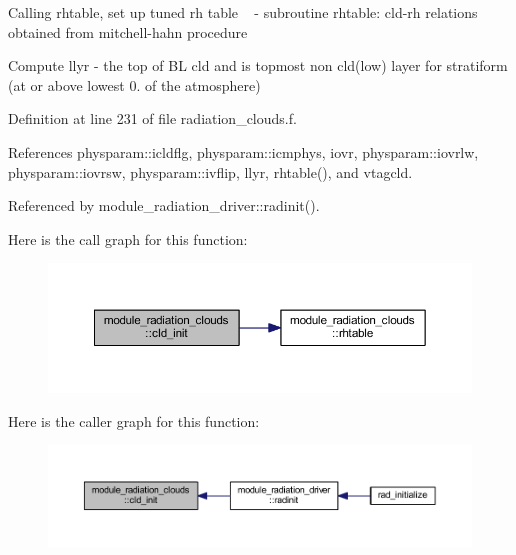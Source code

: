 \begin{DoxyEnumerate}
\item Calling rhtable, set up tuned rh table ~\newline
 -\/ subroutine rhtable\+: cld-\/rh relations obtained from mitchell-\/hahn procedure
\item Compute llyr -\/ the top of BL cld and is topmost non cld(low) layer for stratiform (at or above lowest 0. of the atmosphere) 
\end{DoxyEnumerate}

Definition at line 231 of file radiation\+\_\+clouds.\+f.



References physparam\+::icldflg, physparam\+::icmphys, iovr, physparam\+::iovrlw, physparam\+::iovrsw, physparam\+::ivflip, llyr, rhtable(), and vtagcld.



Referenced by module\+\_\+radiation\+\_\+driver\+::radinit().



Here is the call graph for this function\+:\nopagebreak
\begin{figure}[H]
\begin{center}
\leavevmode
\includegraphics[width=350pt]{namespacemodule__radiation__clouds_ab6fef8945e0a409b2e0968b414ba5573_cgraph}
\end{center}
\end{figure}




Here is the caller graph for this function\+:\nopagebreak
\begin{figure}[H]
\begin{center}
\leavevmode
\includegraphics[width=350pt]{namespacemodule__radiation__clouds_ab6fef8945e0a409b2e0968b414ba5573_icgraph}
\end{center}
\end{figure}



